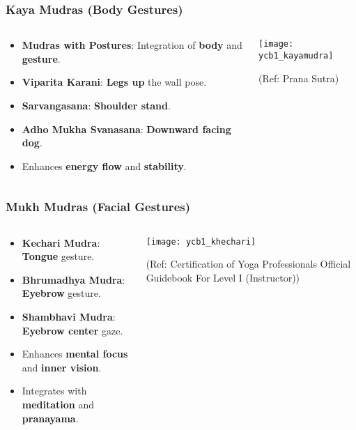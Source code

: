 \begin{frame}[fragile]\frametitle{Kaya Mudras (Body Gestures)}
\begin{columns}
    \begin{column}[T]{0.5\linewidth}
      \begin{itemize}
        \item \textbf{Mudras with Postures}: Integration of \textbf{body} and \textbf{gesture}.
        \item \textbf{Viparita Karani}: \textbf{Legs up} the wall pose.
        \item \textbf{Sarvangasana}: \textbf{Shoulder stand}.
        \item \textbf{Adho Mukha Svanasana}: \textbf{Downward facing dog}.
        \item Enhances \textbf{energy flow} and \textbf{stability}.
      \end{itemize}
    \end{column}
    \begin{column}[T]{0.5\linewidth}
        \begin{center}
        \texttt{[image: ycb1\_kayamudra]}
				
		{\tiny (Ref: Prana Sutra)}	 
        \end{center}	
    \end{column}
\end{columns}
\end{frame}

\begin{frame}[fragile]\frametitle{Mukh Mudras (Facial Gestures)}
\begin{columns}
    \begin{column}[T]{0.5\linewidth}
      \begin{itemize}
        \item \textbf{Kechari Mudra}: \textbf{Tongue} gesture.
        \item \textbf{Bhrumadhya Mudra}: \textbf{Eyebrow} gesture.
        \item \textbf{Shambhavi Mudra}: \textbf{Eyebrow center} gaze.
        \item Enhances \textbf{mental focus} and \textbf{inner vision}.
        \item Integrates with \textbf{meditation} and \textbf{pranayama}.
      \end{itemize}
    \end{column}
    \begin{column}[T]{0.5\linewidth}
        \begin{center}
        \texttt{[image: ycb1\_khechari]}
				
		{\tiny (Ref: Certification  of Yoga Professionals Official Guidebook For Level I (Instructor))}	 
        \end{center}	
    \end{column}
\end{columns}
\end{frame}


